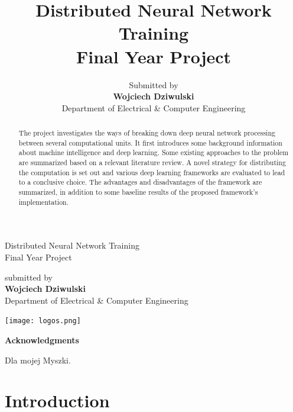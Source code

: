 \documentclass[a4paper, 12pt]{article}
\title{Distributed Neural Network Training \\ \large Final Year Project}
\author{Submitted by \\ \textbf{Wojciech Dziwulski} \\ Department of Electrical \& Computer Engineering}
\date{}
\numberwithin{equation}{section}
\begin{document}
	
	\clearpage

	
	\begin{titlepage}
		\centering
		\vfill
		{\Huge Distributed Neural Network Training}\\
		Final Year Project

		\vskip5cm
			
		submitted by\\
		{\large\textbf{Wojciech Dziwulski}}\\
		Department of Electrical \& Computer Engineering
		
		\vfill
		\texttt{[image: logos.png]} 
		\vfill
		\vfill
	\end{titlepage}
	
	
	\thispagestyle{empty}
	
	\newpage
	
	\begin{abstract}
		The project investigates the ways of breaking down deep neural network processing between several computational units. It first introduces some background information about machine intelligence and deep learning. Some existing approaches to the problem are summarized based on a relevant literature review. A novel strategy for distributing the computation is set out and various deep learning frameworks are evaluated to lead to a conclusive choice. The advantages and disadvantages of the framework are summarized, in addition to some baseline results of the proposed framework's implementation.
		
	\end{abstract}

	\newpage
	
	\begin{center}
		\textbf{Acknowledgments}
	\end{center}

   Dla mojej Myszki.
	
	\newpage
	
	\tableofcontents 
	
	\newpage
	
	\listoffigures
	
	\newpage
	
	
	
	\clearpage
	
	
	\newpage
	
	\clearpage
	
	\pagestyle{wojciech}
	
	\section{Introduction}
	
\end{document}

